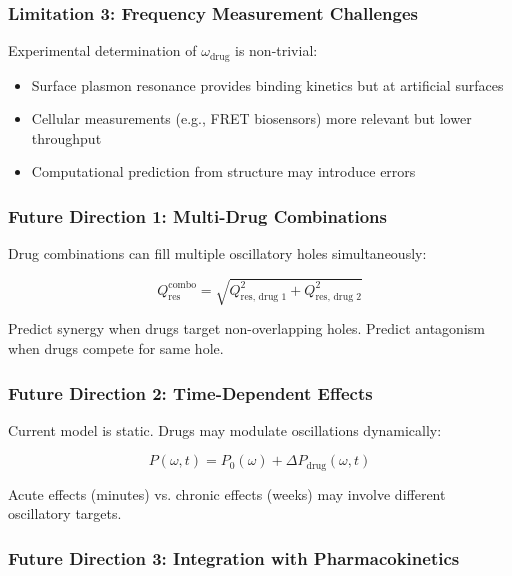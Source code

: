 \documentclass{article}
\begin{document}
\subsubsection{Limitation 3: Frequency Measurement Challenges}

Experimental determination of $\omega_{\text{drug}}$ is non-trivial:

\begin{itemize}
    \item Surface plasmon resonance provides binding kinetics but at artificial surfaces
    \item Cellular measurements (e.g., FRET biosensors) more relevant but lower throughput
    \item Computational prediction from structure may introduce errors
\end{itemize}

\subsubsection{Future Direction 1: Multi-Drug Combinations}

Drug combinations can fill multiple oscillatory holes simultaneously:

\begin{equation}
Q_{\text{res}}^{\text{combo}} = \sqrt{Q_{\text{res, drug 1}}^2 + Q_{\text{res, drug 2}}^2}
\end{equation}

Predict synergy when drugs target non-overlapping holes. Predict antagonism when drugs compete for same hole.

\subsubsection{Future Direction 2: Time-Dependent Effects}

Current model is static. Drugs may modulate oscillations dynamically:

\begin{equation}
P(\omega, t) = P_0(\omega) + \Delta P_{\text{drug}}(\omega, t)
\end{equation}

Acute effects (minutes) vs. chronic effects (weeks) may involve different oscillatory targets.

\subsubsection{Future Direction 3: Integration with Pharmacokinetics}
\end{document}
